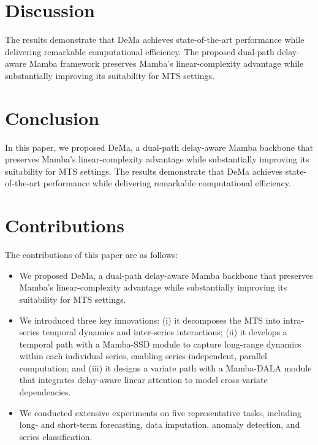 \documentclass{article}
\begin{document}
\section{Discussion}
The results demonstrate that DeMa achieves state-of-the-art performance while delivering remarkable computational efficiency. The proposed dual-path delay-aware Mamba framework preserves Mamba's linear-complexity advantage while substantially improving its suitability for MTS settings.

\section{Conclusion}
In this paper, we proposed DeMa, a dual-path delay-aware Mamba backbone that preserves Mamba's linear-complexity advantage while substantially improving its suitability for MTS settings. The results demonstrate that DeMa achieves state-of-the-art performance while delivering remarkable computational efficiency.

\section{Contributions}
The contributions of this paper are as follows:

\begin{itemize}
\item We proposed DeMa, a dual-path delay-aware Mamba backbone that preserves Mamba's linear-complexity advantage while substantially improving its suitability for MTS settings.
\item We introduced three key innovations: (i) it decomposes the MTS into intra-series temporal dynamics and inter-series interactions; (ii) it develops a temporal path with a Mamba-SSD module to capture long-range dynamics within each individual series, enabling series-independent, parallel computation; and (iii) it designs a variate path with a Mamba-DALA module that integrates delay-aware linear attention to model cross-variate dependencies.
\item We conducted extensive experiments on five representative tasks, including long- and short-term forecasting, data imputation, anomaly detection, and series classification.
\end{itemize}
\end{document}
